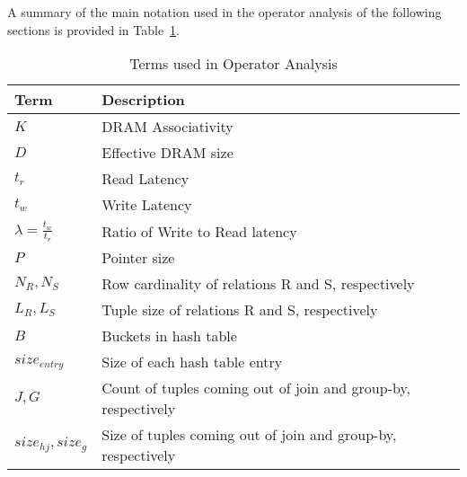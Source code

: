 A summary of the main notation used in the operator analysis of the
following sections is provided in Table~\ref{tab:notations}.


\begin{table}[!h]
\centering
\caption{Terms used in Operator Analysis}
\label{tab:notations}
\begin{small}
\begin{tabular}{p{1.6cm}p{6.2cm}}
\toprule  
\textbf{Term} & \textbf{Description}\\ 
\midrule
\textbf{$K$} & DRAM Associativity\\
\textbf{$D$} & Effective DRAM size\\
\textbf{$t_r$} & Read Latency\\
\textbf{$t_w$} & Write Latency\\
\textbf{$\lambda = \frac{t_w}{t_r}$} & Ratio of Write to Read latency \\
\textbf{$P$} & Pointer size\\
\textbf{$N_R, N_S$} & Row cardinality of relations R and S, respectively\\
\textbf{$L_R, L_S$} & Tuple size of relations R and S, respectively\\
\textbf{$B$} & Buckets in hash table\\
\textbf{$size_{entry}$} & Size of each hash table entry\\
\textbf{$J,G$} & Count of tuples coming out of join and group-by, respectively\\
\textbf{$size_{hj},size_{g}$} & Size of tuples coming out of join and group-by, respectively\\
\bottomrule
\end{tabular}
\end{small}
\end{table}